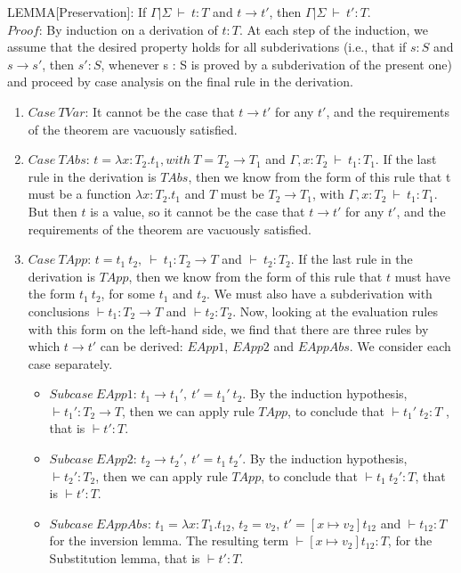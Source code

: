 \documentclass [proof]{article}
\newcommand{\tto}{\longrightarrow}
\newcommand{\env}{{\Gamma | \Sigma \ \vdash}}
\begin{document}
LEMMA[Preservation]: If $\env \ t : T$ and $t \tto t'$, then $\env \ t' : T$.\\
$Proof$: By induction on a derivation of $t : T$. At each step of the induction, we assume that the desired property holds for all subderivations (i.e., that if $s : S$ and $s \tto s'$, then $s' : S$, whenever s : S is proved by a subderivation of the present one) and proceed by case analysis on the final rule in the derivation.
\begin{enumerate}
\item $Case \ TVar$: It cannot be the case that $t \tto t'$ for any $t'$, and the requirements of the theorem are vacuously satisfied.
\item $Case \ TAbs$: $t = \lambda x:T_2.t_1, with \ T = T_2 \to T_1$ and $ \Gamma, x:T_2 \ \vdash \ t_1 : T_1$. If the last rule in the derivation is $TAbs$, then we know from the form of this rule that t must be a function $\lambda x:T_2.t_1$ and $T$ must be $T_2 \to T_1$, with $ \Gamma, x:T_2 \ \vdash \ t_1 : T_1$. But then $t$ is a value, so it cannot be the case that $t \tto t'$ for any $t'$, and the requirements of the theorem are vacuously satisfied.
\item $Case \ TApp$: $t = t_1 \ t_2, \ \vdash \ t_1 : T_2 \to T$ and $\vdash \ t_2 : T_2$. If the last rule in the derivation is $TApp$, then we know from the form of this rule that $t$ must have the form $t_1 \ t_2$, for some $t_1$ and $t_2$. We must also have a subderivation with conclusions $\vdash t_1 : T_2 \to T$ and $\vdash t_2 : T_2$. Now, looking at the evaluation rules with this form on the left-hand side, we find that there are three rules by which $t \tto t'$ can be derived: $EApp1$, $EApp2$ and $EAppAbs$. We consider each case separately.
\begin{itemize}
\item $Subcase \ EApp1$: $t_1 \tto t_1', \ t' = t_1' \ t_2$. By the induction hypothesis, $\vdash t_1' : T_2 \to T$, then we can apply rule $TApp$, to conclude that $\vdash t_1' \ t_2: T$ , that is $\vdash t' : T$.
\item $Subcase \ EApp2$: $t_2 \tto t_2', \ t' = t_1 \ t_2'$. By the induction hypothesis, $\vdash t_2' : T_2 $, then we can apply rule $TApp$, to conclude that $\vdash t_1 \ t_2' : T$, that is $\vdash t' : T$.
\item $Subcase \ EAppAbs$: $t_1 = \lambda x:T_{1}.t_{12}$, $t_2 = v_2$, $t' = [x \mapsto v_2]t_{12}$ and $\vdash t_{12}: T$ for the inversion lemma. The resulting term $\vdash [x \mapsto v_2]t_{12}:T$, for the Substitution lemma, that is $\vdash t' : T$.
\end{itemize}

\end{enumerate}
\end{document}
